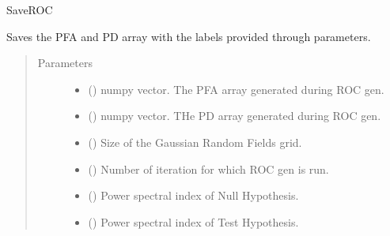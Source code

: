 \documentclass[letterpaper,10pt,english]{sphinxmanual}
\begin{document}

\begin{fulllineitems}
\label{\detokenize{utilities:utilities.saveROC}}
\sphinxAtStartPar
SaveROC

\sphinxAtStartPar
Saves the PFA and PD array with the labels provided through parameters.
\begin{quote}\begin{description}
\item[{Parameters}] \leavevmode\begin{itemize}
\item {} 
\sphinxAtStartPar
{} () \textendash{} numpy vector. The PFA array generated during ROC gen.

\item {} 
\sphinxAtStartPar
{} () \textendash{} numpy vector. THe PD array generated during ROC gen.

\item {} 
\sphinxAtStartPar
{} () \textendash{} Size of the Gaussian Random Fields grid.

\item {} 
\sphinxAtStartPar
{} () \textendash{} Number of iteration for which ROC gen is run.

\item {} 
\sphinxAtStartPar
{} () \textendash{} Power spectral index of Null Hypothesis.

\item {} 
\sphinxAtStartPar
{} () \textendash{} Power spectral index of Test Hypothesis.


\end{itemize}
\end{description}
\end{quote}
\end{fulllineitems}
\end{document}
